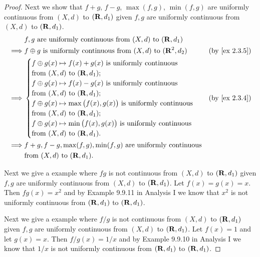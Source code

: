 \begin{proof}
  Next we show that \(f + g\), \(f - g\), \(\max(f, g)\), \(\min(f, g)\) are uniformly continuous from \((X, d)\) to \((\mathbf{R}, d_1)\) given \(f, g\) are uniformly continuous from \((X, d)\) to \((\mathbf{R}, d_1)\).
  \begin{align*}
             & f, g \text{ are uniformly continuous from } (X, d) \text{ to } (\R, d_1)                                        \\
    \implies & f \oplus g \text{ is uniformly continuous from } (X, d) \text{ to } (\R^2, d_2)   & \text{(by \cref{ex 2.3.5})} \\
    \implies & \begin{cases}
                 f \oplus g(x) \mapsto f(x) + g(x) \text{ is uniformly continuous}              \\
                 \text{from } (X, d) \text{ to } (\R, d_1);                                     \\
                 f \oplus g(x) \mapsto f(x) - g(x) \text{ is uniformly continuous}              \\
                 \text{from } (X, d) \text{ to } (\R, d_1);                                     \\
                 f \oplus g(x) \mapsto \max\big(f(x), g(x)\big) \text{ is uniformly continuous} \\
                 \text{from } (X, d) \text{ to } (\R, d_1);                                     \\
                 f \oplus g(x) \mapsto \min\big(f(x), g(x)\big) \text{ is uniformly continuous} \\
                 \text{from } (X, d) \text{ to } (\R, d_1).
               \end{cases} & \text{(by \cref{ex 2.3.4})}                                  \\
    \implies & f + g, f - g, \max(f, g), \min(f, g) \text{ are uniformly continuous}                                           \\
             & \text{from } (X, d) \text{ to } (\R, d_1).
  \end{align*}

  Next we give a example where \(fg\) is not continuous from \((X, d)\) to \((\mathbf{R}, d_1)\) given \(f, g\) are uniformly continuous from \((X, d)\) to \((\mathbf{R}, d_1)\).
  Let \(f(x) = g(x) = x\).
  Then \(fg(x) = x^2\) and by Example 9.9.11 in Analysis I we know that \(x^2\) is not uniformly continuous from \((\mathbf{R}, d_1)\) to \((\mathbf{R}, d_1)\).

  Next we give a example where \(f / g\) is not continuous from \((X, d)\) to \((\mathbf{R}, d_1)\) given \(f, g\) are uniformly continuous from \((X, d)\) to \((\mathbf{R}, d_1)\).
  Let \(f(x) = 1\) and let \(g(x) = x\).
  Then \(f / g(x) = 1 / x\) and by Example 9.9.10 in Analysis I we know that \(1 / x\) is not uniformly continuous from \((\mathbf{R}, d_1)\) to \((\mathbf{R}, d_1)\).


\end{proof}
